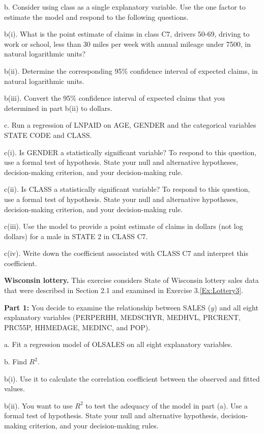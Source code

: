 \begin{exercises}
b. Consider using class as a single explanatory variable. Use the
one factor to estimate the model and respond to the following
questions.

b(i). What is the point estimate of claims in class C7, drivers
50-69, driving to work or school, less than 30 miles per week with
annual mileage under 7500, in natural logarithmic units?

b(ii). Determine the corresponding 95\% confidence interval of
expected claims, in natural logarithmic units.

b(iii). Convert the 95\% confidence interval of expected claims that
you determined in part b(ii) to dollars.

c. Run a regression of LNPAID on AGE, GENDER and the categorical
variables STATE CODE and CLASS.

c(i). Is GENDER a statistically significant variable? To respond to
this question, use a formal test of hypothesis. State your null and
alternative hypotheses, decision-making criterion, and your
decision-making rule.

c(ii). Is CLASS a statistically significant variable? To respond to
this question, use a formal test of hypothesis. State your null and
alternative hypotheses, decision-making criterion, and your
decision-making rule.

c(iii). Use the model to provide a point estimate of claims in
dollars (not log dollars) for a male in STATE 2 in CLASS C7.

c(iv). Write down the coefficient associated with CLASS C7 and
interpret this coefficient.


\item \textbf{Wisconsin lottery.}\label{Ex:Lottery4}
This exercise considers State of Wisconsin lottery sales data that
were described in Section 2.1 and examined in Exercise
3.\ref{Ex:Lottery3}.

\textbf{Part 1:} You decide to examine the relationship between
SALES ($y$) and all eight explanatory variables (PERPERHH, MEDSCHYR,
MEDHVL, PRCRENT, PRC55P, \newline HHMEDAGE, MEDINC, and POP).

a. Fit a regression model of OLSALES on all eight explanatory
variables.

b. Find $R^{2}$.

b(i). Use it to calculate the correlation coefficient between the
observed and fitted values.

b(ii). You want to use $R^{2}$ to test the adequacy of the model in
part (a). Use a formal test of hypothesis. State your null and
alternative hypothesis, decision-making criterion, and your
decision-making rules.


\end{exercises}
